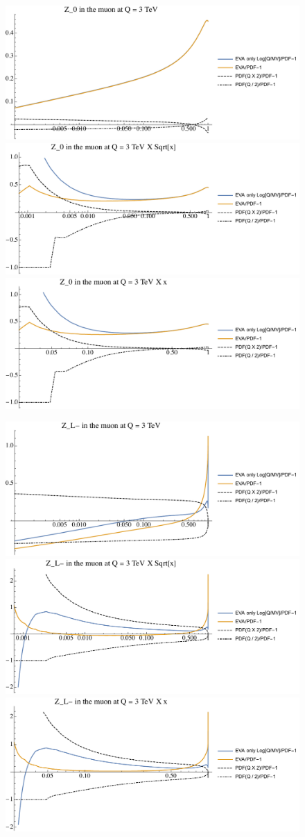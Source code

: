 \documentclass[a4paper,11pt]{article}
\begin{document}
\begin{figure}[ht]
\includegraphics[width=0.46\linewidth]{PlotPDFs/ratios/3TeV/Z_0_Q.pdf}
\includegraphics[width=0.46\linewidth]{PlotPDFs/ratios/3TeV/Z_0_Qsqrtx.pdf}
\includegraphics[width=0.46\linewidth]{PlotPDFs/ratios/3TeV/Z_0_Qx.pdf}
\end{figure}

\begin{figure}[ht]
\includegraphics[width=0.46\linewidth]{PlotPDFs/ratios/3TeV/Z_L-_Q.pdf}
\includegraphics[width=0.46\linewidth]{PlotPDFs/ratios/3TeV/Z_L-_Qsqrtx.pdf}
\includegraphics[width=0.46\linewidth]{PlotPDFs/ratios/3TeV/Z_L-_Qx.pdf}
\end{figure}
\end{document}
